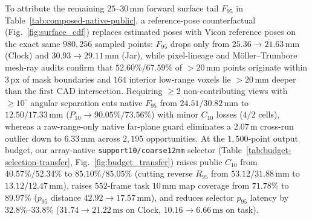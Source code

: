 \documentclass[10pt,journal]{IEEEtran}
\begin{document}
\begin{table}[t]\centering\scriptsize
\caption{\textbf{EvidenceScene} composed native repairs (RANSAC determinism + exact inverse-pose coefficient transfer + guarded \texttt{NO\_BA} retirement) vs. historical frozen BundleTrack on Laval Clock-full and Cookiejar. Strict: $\le 10\,\mathrm{mm}$ and $\le 10^\circ$.}\label{tab:composed-native-public}
\end{table}

To attribute the remaining $25$--$30\,\mathrm{mm}$ forward surface tail $F_{95}$ in Table~\ref{tab:composed-native-public}, a reference-pose counterfactual (Fig.~\ref{fig:surface_cdf}) replaces estimated poses with Vicon reference poses on the exact same $980{,}256$ sampled points: $F_{95}$ drops only from $25.36\to 21.63\,\mathrm{mm}$ (Clock) and $30.93\to 29.11\,\mathrm{mm}$ (Jar), while pixel-lineage and M\"oller--Trumbore mesh-ray audits confirm that $52.60\%/67.59\%$ of $>20\,\mathrm{mm}$ points originate within $3\,\mathrm{px}$ of mask boundaries and $164$ interior low-range voxels lie $>20\,\mathrm{mm}$ deeper than the first CAD intersection. Requiring $\ge 2$ non-contributing views with $\ge 10^\circ$ angular separation cuts native $F_{95}$ from $24.51/30.82\,\mathrm{mm}$ to $12.50/17.33\,\mathrm{mm}$ ($P_{10}\to 90.05\%/73.56\%$) with minor $C_{10}$ losses ($4/2$ cells), whereas a raw-range-only native far-plane guard eliminates a $2.07\,\mathrm{m}$ cross-run outlier down to $6.33\,\mathrm{mm}$ across $2{,}195$ opportunities. At the $1{,}500$-point output budget, our array-native \texttt{support10/coarse12mm} selector (Table~\ref{tab:budget-selection-transfer}, Fig.~\ref{fig:budget_transfer}) raises public $C_{10}$ from $40.57\%/52.34\%$ to $\mathbf{85.10\%/85.05\%}$ (cutting reverse $R_{95}$ from $53.12/31.88\,\mathrm{mm}$ to $13.12/12.47\,\mathrm{mm}$), raises $552$-frame task $10\,\mathrm{mm}$ map coverage from $71.78\%$ to $\mathbf{89.97\%}$ ($p_{95}$ distance $42.92\to 17.57\,\mathrm{mm}$), and reduces selector $p_{95}$ latency by $32.8\%$--$33.8\%$ ($31.74\to 21.22\,\mathrm{ms}$ on Clock, $10.16\to 6.66\,\mathrm{ms}$ on task).
\end{document}
